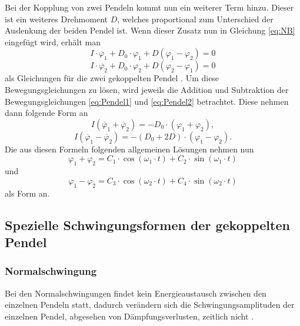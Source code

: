 Bei der Kopplung von zwei Pendeln kommt nun ein weiterer Term hinzu. Dieser ist ein weiteres Drehmoment $D$, welches proportional zum Unterschied der Auslenkung der beiden Pendel ist. Wenn dieser Zusatz nun in Gleichung \ref{eq:NB} eingefügt wird, erhält man
\begin{equation}
    I \cdot \ddot{\varphi_1} + D_0 \cdot \varphi_1 + D\left(\varphi_1 - \varphi_2\right) = 0
    \label{eq:Pendel1}
\end{equation}
\begin{equation}
    I \cdot \ddot{\varphi_2} + D_0 \cdot \varphi_2 + D\left(\varphi_2 - \varphi_1\right) = 0
    \label{eq:Pendel2}
\end{equation}
als Gleichungen für die zwei gekoppelten Pendel \cite{M5}. Um diese Bewegungsgleichungen zu lösen, wird jeweils die Addition und Subtraktion der Bewegungsgleichungen \ref{eq:Pendel1} und \ref{eq:Pendel2} betrachtet. Diese nehmen dann folgende Form an
\begin{equation}
    I\left(\ddot{\varphi_1} + \ddot{\varphi_2}\right) = - D_0 \cdot \left(\varphi_1 + \varphi_2\right),
\end{equation}
\begin{equation}
    I\left(\ddot{\varphi_1} - \ddot{\varphi_2}\right) = - \left(D_0 + 2D\right) \cdot \left(\varphi_1 - \varphi_2\right).
\end{equation}
Die aus diesen Formeln folgenden allgemeinen Lösungen nehmen nun
\begin{equation}
    \varphi_1 + \varphi_2 = C_1 \cdot \cos\left(\omega_1 \cdot t\right) + C_2 \cdot \sin\left(\omega_1 \cdot t\right)
    \label{Allg1}
\end{equation}
und
\begin{equation}
    \varphi_1 - \varphi_2 = C_3 \cdot \cos\left(\omega_2 \cdot t\right) + C_4 \cdot \sin\left(\omega_2 \cdot t\right)
    \label{Allg2}
\end{equation}
als Form an.

\subsection{Spezielle Schwingungsformen der gekoppelten Pendel}

\subsubsection{Normalschwingung}
Bei den Normalschwingungen findet kein Energieaustausch zwischen den einzelnen Pendeln statt, dadurch verändern sich die Schwingungsamplituden der einzelnen Pendel, abgesehen von Dämpfungsverlusten, zeitlich nicht \cite{M5}.

